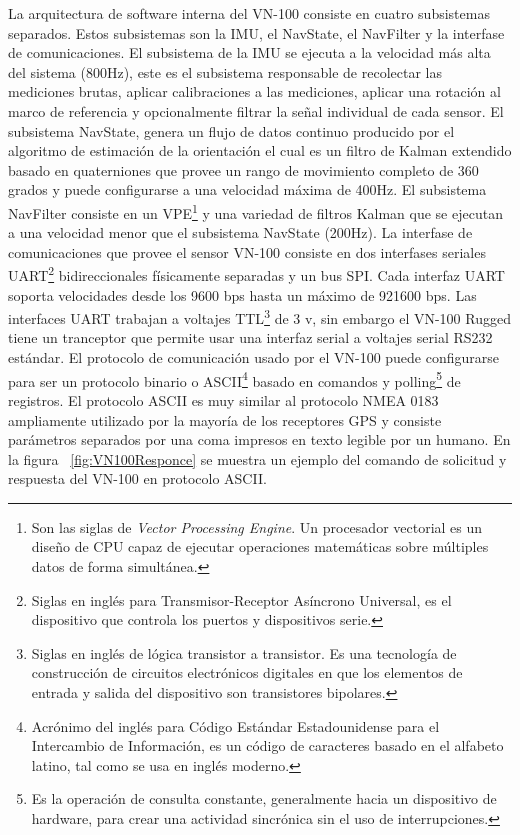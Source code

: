 La arquitectura de software interna del VN-100 consiste en cuatro subsistemas separados. Estos subsistemas son la IMU, el NavState, el NavFilter y la interfase de comunicaciones. El subsistema de la IMU se ejecuta a la velocidad m\'{a}s alta del sistema (800Hz), este es el subsistema responsable de recolectar las mediciones brutas, aplicar calibraciones a las mediciones, aplicar una rotaci\'{o}n al marco de referencia y opcionalmente filtrar la se\~{n}al individual de cada sensor. El subsistema NavState, genera un flujo de datos continuo producido por el algoritmo de estimaci\'{o}n de la orientaci\'{o}n el cual es un filtro de Kalman extendido basado en quaterniones que provee un rango de movimiento completo de 360 grados y puede configurarse a una velocidad m\'{a}xima de 400Hz. El subsistema NavFilter consiste en un VPE\footnote{Son las siglas de \textit{Vector Processing Engine}. Un procesador vectorial es un dise\~{n}o de CPU capaz de ejecutar operaciones matem\'{a}ticas sobre m\'{u}ltiples datos de forma simult\'{a}nea.} y una variedad de filtros Kalman que se ejecutan a una velocidad menor que el subsistema NavState (200Hz). La interfase de comunicaciones que provee el sensor VN-100 consiste en dos interfases seriales UART\footnote{Siglas en ingl\'{e}s para Transmisor-Receptor As\'{i}ncrono Universal, es el dispositivo que controla los puertos y dispositivos serie.} bidireccionales f\'{i}sicamente separadas y un bus SPI. Cada interfaz UART soporta velocidades desde los 9600 bps hasta un m\'{a}ximo de 921600 bps. Las interfaces UART trabajan a voltajes TTL\footnote{Siglas en ingl\'{e}s de l\'{o}gica transistor a transistor. Es una tecnolog\'{i}a de construcci\'{o}n de circuitos electr\'{o}nicos digitales en que  los elementos de entrada y salida del dispositivo son transistores bipolares.} de 3 v, sin embargo el VN-100 Rugged tiene un tranceptor que permite usar una interfaz serial a voltajes serial RS232 est\'{a}ndar. El protocolo de comunicaci\'{o}n usado por el VN-100 puede configurarse para ser un protocolo binario o ASCII\footnote{Acr\'{o}nimo del ingl\'{e}s para C\'{o}digo Est\'{a}ndar Estadounidense para el Intercambio de Informaci\'{o}n, es un c\'{o}digo de caracteres basado en el alfabeto latino, tal como se usa en ingl\'{e}s moderno.} basado en comandos y polling\footnote{Es la operaci\'{o}n de consulta constante, generalmente hacia un dispositivo de hardware, para crear una actividad sincr\'{o}nica sin el uso de interrupciones.} de registros. El protocolo ASCII es muy similar al protocolo NMEA 0183 ampliamente utilizado por la mayor\'{i}a de los receptores GPS y consiste par\'{a}metros separados por una coma impresos en texto legible por un humano. En la figura ~\ref{fig:VN100Responce} se muestra un ejemplo del comando de solicitud y respuesta del VN-100 en protocolo ASCII.

